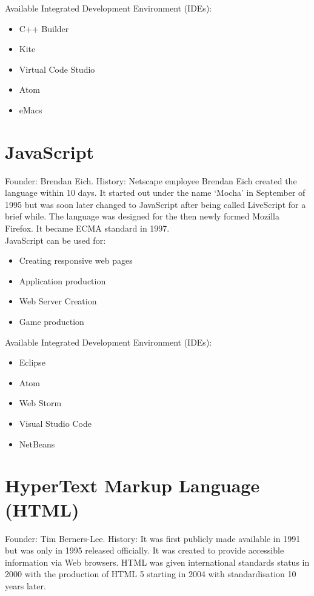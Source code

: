 \documentclass{article}
\begin{document}
    Available Integrated Development Environment (IDEs):
	\begin{itemize}
	\item C++ Builder
	\item Kite
	\item Virtual Code Studio
	\item Atom
	\item eMacs\\
	\end{itemize}   
    
    \section{JavaScript}
    Founder: Brendan Eich. History:
    Netscape employee Brendan Eich created the language within 10 days. It started out under the name ‘Mocha’ in September of 1995 but was soon later changed to JavaScript after being called LiveScript for a brief while.
    The language was designed for the then newly formed Mozilla Firefox.
    It became ECMA standard in 1997.\\
    
    JavaScript can be used for:
	\begin{itemize}
	 \item Creating responsive web pages 
	 \item Application production
	 \item Web Server Creation
	 \item Game production\\
    \end{itemize} 

    Available Integrated Development Environment (IDEs):
   \begin{itemize}
	\item Eclipse
	\item Atom
	\item Web Storm
	\item Visual Studio Code
	\item NetBeans\\
   \end{itemize}


   \section{HyperText Markup Language (HTML)}
   Founder: Tim Berners-Lee. History:
   It was first publicly made available in 1991 but was only in 1995 released officially. 
   It was created to provide accessible information via Web browsers.
   HTML was given international standards status in 2000 with the production of HTML 5 starting in 2004 with standardisation 10 years later.\\
   
\end{document}
